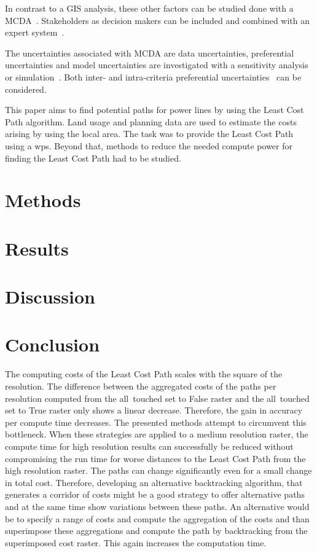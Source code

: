 \documentclass[acmtog]{acmart}
\begin{document}
	In contrast to a GIS analysis, these other factors can be studied done with a \acrfull{MCDA}~\cite{bertsch_participatory_2016}.
	Stakeholders as decision makers can be included and combined with an expert system~\cite{bertsch_participatory_2016}.
	
	The uncertainties associated with \acrshort{MCDA} are data uncertainties, preferential uncertainties and model uncertainties are investigated with a sensitivity analysis~\cite{bertsch_participatory_2016} or simulation~\cite{butler_simulation_1997}.
	Both inter- and intra-criteria preferential uncertainties~\cite{bertsch_sensitivity_2007} can be considered.
	
	This paper aims to find potential paths for power lines by using the Least Cost Path algorithm. Land usage and planning data are used to estimate the costs arising by using the local area. The task was to provide the Least Cost Path using a \acrfull{wps}. 
	Beyond that, methods to reduce the needed compute power for finding the Least Cost Path had to be studied.
	
	\section{Methods}\label{sec:methods}
	

	\section{Results}\label{sec:results}
	
	
	\section{Discussion}\label{sec:discussion}
	
		
	\section{Conclusion}\label{sec:conclusion}
	The computing costs of the Least Cost Path scales with the square of the resolution.
	The difference between the aggregated costs of the paths per resolution computed from the all~touched set to False raster and the all~touched set to True raster only shows a linear decrease.
	Therefore, the gain in accuracy per compute time decreases.
	The presented methods attempt to circumvent this bottleneck.
	When these strategies are applied to a medium resolution raster, the compute time for high resolution results can successfully be reduced without compromising the run time for worse distances to the Least Cost Path from the high resolution raster.
	The paths can change significantly even for a small change in total cost.
	Therefore, developing an alternative backtracking algorithm, that generates a corridor of costs might be a good strategy to offer alternative paths and at the same time show variations between these paths.
	An alternative would be to specify a range of costs and compute the aggregation of the costs and than superimpose these aggregations and compute the path by backtracking from the superimposed cost raster. 
	This again increases the computation time.
	
\end{document}
